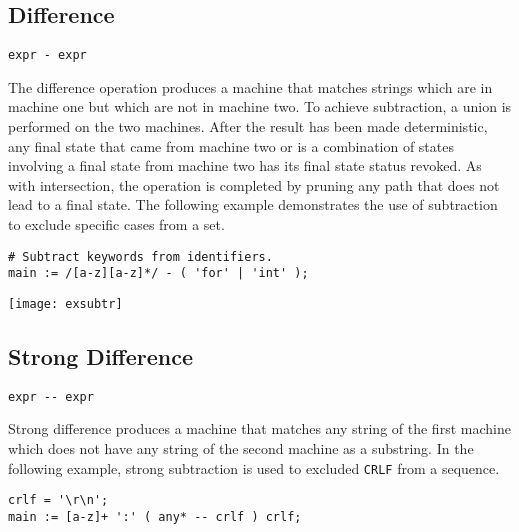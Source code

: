 \documentclass[letterpaper,11pt,oneside]{book}
\newcommand{\verbspace}{\vspace{10pt}}
\newcommand{\graphspace}{\vspace{10pt}}
\newenvironment{inline_code}{\def\baselinestretch{1}\vspace{12pt}\small}{}
\begin{document}
\subsection{Difference}

\verb|expr - expr|
\verbspace

The difference operation produces a machine that matches
strings which are in machine one but which are not in machine two. To achieve subtraction,
a union is performed on the two machines. After the result has been made
deterministic, any final state that came from machine two or is a combination
of states involving a final state from machine two has its final state status
revoked. As with intersection, the operation is completed by pruning any path
that does not lead to a final state.  The following example demonstrates the
use of subtraction to exclude specific cases from a set.

\verbspace

% GENERATE: exsubtr
\begin{inline_code}
\begin{verbatim}
# Subtract keywords from identifiers.
main := /[a-z][a-z]*/ - ( 'for' | 'int' );
\end{verbatim}
\end{inline_code}

\graphspace
\begin{center}
\texttt{[image: exsubtr]}
\end{center}
\graphspace


\subsection{Strong Difference}
\label{strong_difference}

\verb|expr -- expr|
\verbspace

Strong difference produces a machine that matches any string of the first
machine which does not have any string of the second machine as a substring. In
the following example, strong subtraction is used to excluded \verb|CRLF| from
a sequence.

\begin{inline_code}
\begin{verbatim}
crlf = '\r\n';
main := [a-z]+ ':' ( any* -- crlf ) crlf;
\end{verbatim}
\end{inline_code}
\end{document}
